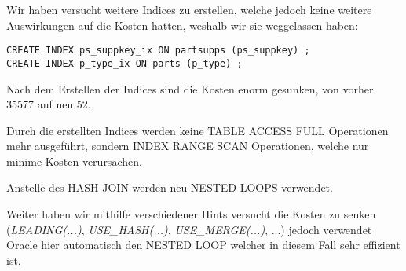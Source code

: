 \documentclass[11pt,a4paper,parskip=half]{scrartcl}
\begin{document}
Wir haben versucht weitere Indices zu erstellen, welche jedoch keine weitere Auswirkungen auf die Kosten hatten, weshalb wir sie weggelassen haben:
\begin{lstlisting}
CREATE INDEX ps_suppkey_ix ON partsupps (ps_suppkey) ;
CREATE INDEX p_type_ix ON parts (p_type) ;
\end{lstlisting}

Nach dem Erstellen der Indices sind die Kosten enorm gesunken, von vorher 35577 auf neu 52.

Durch die erstellten Indices werden keine TABLE ACCESS FULL Operationen mehr ausgeführt, sondern INDEX RANGE SCAN Operationen, welche nur minime Kosten verursachen.

Anstelle des HASH JOIN werden neu NESTED LOOPS verwendet.

Weiter haben wir mithilfe verschiedener Hints versucht die Kosten zu senken (\emph{LEADING(...)}, \emph{USE\_HASH(...)}, \emph{USE\_MERGE(...)}, ...) jedoch verwendet Oracle hier automatisch den NESTED LOOP welcher in diesem Fall sehr effizient ist. 
\end{document}

